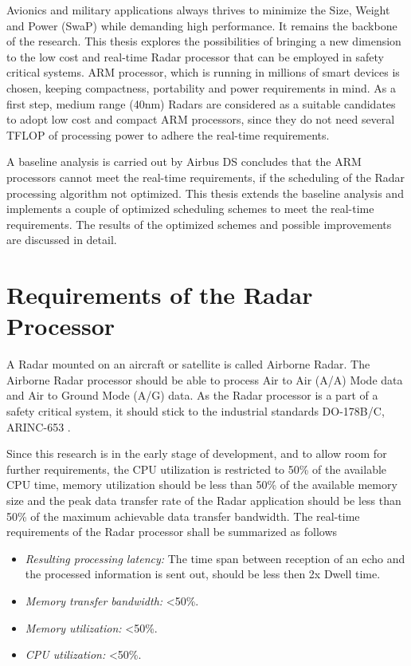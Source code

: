 Avionics and military applications always thrives to minimize the Size, Weight and Power (SwaP) while demanding high performance. It remains the backbone of the research. This thesis explores the possibilities of bringing a new dimension to the low cost and real-time Radar processor that can be employed in safety critical systems. ARM processor, which is running in millions of smart devices\cite{armWeb} is chosen, keeping compactness, portability and power requirements in mind. As a first step, medium range (40nm) Radars are considered as a suitable candidates to adopt low cost and compact ARM processors, since they do not need several TFLOP of processing power to adhere the real-time requirements.

A baseline analysis is carried out by Airbus DS concludes that the ARM processors cannot meet the real-time requirements, if the scheduling of the Radar processing algorithm not optimized. This thesis extends the baseline analysis and implements a couple of optimized scheduling schemes to meet the real-time requirements. The results of the optimized schemes and possible improvements are discussed in detail.

\section{Requirements of the Radar Processor}
\label{sec:intro:realtime_req}
A Radar mounted on an aircraft or satellite is called Airborne Radar. The Airborne Radar processor should be able to process Air to Air (A/A) Mode data and Air to Ground Mode (A/G) data. As the Radar processor is a part of a safety critical system, it should stick to the industrial standards DO-178B/C, ARINC-653 \cite{arinc653} \cite{do178b}.

Since this research is in the early stage of development, and to allow room for further requirements, the CPU utilization is restricted to 50\% of the available CPU time, memory utilization should be less than 50\% of the available memory size and the peak data transfer rate of the Radar application should be less than 50\% of the maximum achievable data transfer bandwidth. The real-time requirements of the Radar processor shall be summarized as follows
\begin{itemize}
        \itemsep0em
        \item \textit{Resulting processing latency:} The time span between reception of an echo and the processed information is sent out, should be less then 2x Dwell time.
        \item \textit{Memory transfer bandwidth:} <50\%.
        \item \textit{Memory utilization:} <50\%.
        \item \textit{CPU utilization:} <50\%.
\end{itemize}


